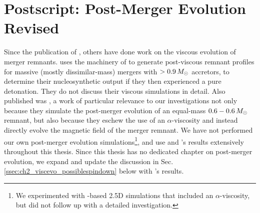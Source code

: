\section{Postscript: Post-Merger Evolution Revised}
\label{sec:c2_postscript}

Since the publication of \citeal{zhu+13}, others have done work on the viscous evolution of merger remnants.  \cite{rask+14} uses the machinery of \cite{schw+12} to generate post-viscous remnant profiles for massive (mostly dissimilar-mass) mergers with $>0.9\,\Msun$ accretors, to determine their nucleosynthetic output if they then experienced a pure detonation.  They do not discuss their viscous simulations in detail.  Also published was \cite{ji+13}, a work of particular relevance to our investigations not only because they simulate the post-merger evolution of an equal-mass $0.6-0.6\,\Msun$ remnant, but also because they eschew the use of an $\alpha$-viscosity and instead directly evolve the magnetic field of the merger remnant.  We have not performed our own post-merger evolution simulations\footnote{We experimented with \flash-based 2.5D simulations that included an $\alpha$-viscosity, but did not follow up with a detailed investigation.}, and use \cite{schw+12} and \cite{ji+13}'s results extensively throughout this thesis.  Since this thesis has no dedicated chapter on post-merger evolution, we expand and update the discussion in Sec. \ref{ssec:ch2_viscevo_possiblespindown} below with \cite{ji+13}'s results.


